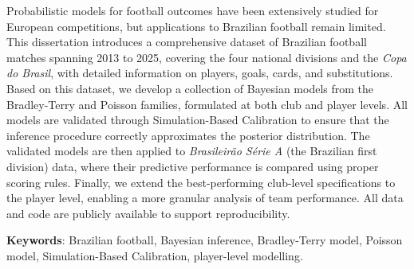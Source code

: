 \setlength{\absparsep}{18pt}
\begin{resumo}[Abstract]
    Probabilistic models for football outcomes have been extensively studied for European competitions, but applications to Brazilian football remain limited.
    This dissertation introduces a comprehensive dataset of Brazilian football matches spanning 2013 to 2025, covering the four national divisions and the \textit{Copa do Brasil}, with detailed information on players, goals, cards, and substitutions.
    Based on this dataset, we develop a collection of Bayesian models from the Bradley-Terry and Poisson families, formulated at both club and player levels.
    All models are validated through Simulation-Based Calibration to ensure that the inference procedure correctly approximates the posterior distribution.
    The validated models are then applied to \textit{Brasileirão Série A} (the Brazilian first division) data, where their predictive performance is compared using proper scoring rules.
    Finally, we extend the best-performing club-level specifications to the player level, enabling a more granular analysis of team performance.
    All data and code are publicly available to support reproducibility.

    \vspace{\onelineskip}

    \noindent
    \textbf{Keywords}: Brazilian football, Bayesian inference, Bradley-Terry model, Poisson model, Simulation-Based Calibration, player-level modelling.    
\end{resumo}

